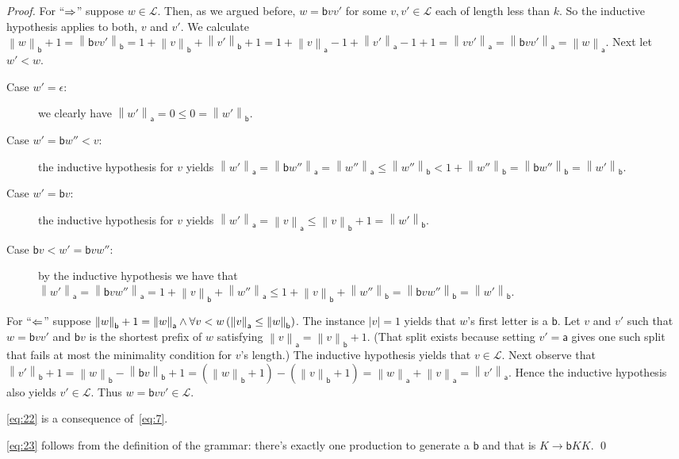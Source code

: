 \documentclass[a4paper]{scrartcl}
\newcommand{\ah}{\mathsf{a}}
\newcommand{\be}{\mathsf{b}}
\newcommand{\length}[1]{\left|#1\right|}
\newcommand{\noof}[2]{\left\|#1\right\|_{#2}}
\def\L{\mathcal{L}}
\begin{document}
\begin{proof}
  For ``$\Rightarrow$'' suppose $w\in\L$. Then, as we argued
  before, $w = \be v v'$ for some $v,v'\in\L$ each of length
  less than $k$. So the inductive hypothesis applies to both, $v$ and
  $v'$. We calculate $\noof w\be + 1 = \noof{\be vv'}\be = 1 + \noof
  v\be + \noof{v'}\be + 1 = 1 + \noof v\ah - 1 + \noof{v'}\ah - 1 + 1
  = \noof{vv'}\ah = \noof{\be vv'}\ah = \noof w\ah$. Next let $w' <
  w$.
  \begin{description}
  \item[Case $w' = \epsilon$:] we clearly have
    $\noof{w'}\ah = 0 \leq 0 = \noof{w'}\be$.
  \item[Case $w' = \be w'' < v$:] the inductive hypothesis for $v$
    yields $\noof{w'}\ah = \noof{\be w''}\ah = \noof{w''}\ah\leq
    \noof{w''}\be < 1+\noof{w''}\be = \noof{\be w''}\be
    =\noof{w'}\be$.
  \item[Case $w' = \be v$:] the inductive hypothesis for $v$ yields
    $\noof{w'}\ah = \noof v\ah \leq \noof v\be + 1 = \noof{w'}\be$.
  \item[Case $\be v < w' = \be v w''$:] by the inductive hypothesis we
    have that $\noof{w'}\ah = \noof{\be v w''}\ah = 1+\noof v\be +
    \noof{w''}\ah \leq 1+\noof v\be + \noof{w''}\be = \noof{\be v
      w''}\be = \noof{w'}\be$.
  \end{description}
  For ``$\Leftarrow$'' suppose $\noof w\be+1=\noof w\ah \AND
  \ALL{v<w}{\noof v\ah\leq\noof w\be}$. The instance $\length v = 1$
  yields that $w$'s first letter is a $\be$. Let $v$ and $v'$ such
  that $w=\be vv'$ and $\be v$ is the shortest prefix of $w$
  satisfying $\noof v\ah = \noof v\be + 1$. (That split exists because
  setting $v' = \ah$ gives one such split that fails at most the
  minimality condition for $v$'s length.) The inductive hypothesis
  yields that $v\in\L$. Next observe that $\noof{v'}\be+1 =
  \noof w\be - \noof{\be v}\be + 1 = (\noof w\be + 1) - (\noof v\be +
  1) = \noof w\ah + \noof v\ah = \noof{v'}\ah$. Hence the inductive
  hypothesis also yields $v'\in\L$. Thus $w=\be vv' \in \L$.

  \eqref{eq:22} is a consequence of~\eqref{eq:7}.

  \eqref{eq:23} follows from the definition of the grammar: there's exactly
  one production to generate a $\be$ and that is $K\to\be KK$.
  \qed
\end{proof}
\end{document}
